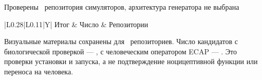 \begin{frame}{Проверены \ProgSimTotal\ репозитория симуляторов, архитектура генератора не выбрана}
\begin{tabularx}{\linewidth}{|L{0.28\linewidth}|L{0.11\linewidth}|Y|}
\hline Итог & Число & Репозитории \\\hline
\ProgSimStatusRows
\end{tabularx}
\SlideGap
Визуальные материалы сохранены для \ProgSimVisuals\ репозиториев. Число кандидатов с биологической проверкой --- \ProgSimBiological, с человеческим оператором ECAP --- \ProgSimEcap.
\SlideGap
Это проверки установки и запуска, а не подтверждение ноцицептивной функции или переноса на человека.
\end{frame}
